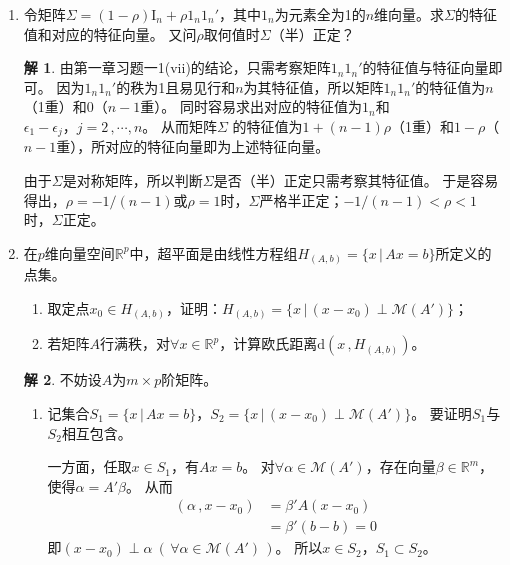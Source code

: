 \documentclass[10pt]{article}
\theoremstyle{definition}
\newtheorem*{solution}{解}
\theoremstyle{definition}
\begin{document}
\begin{enumerate}
    \item	%
        令矩阵$\Sigma =(1-\rho)\mathrm{I}_n+\rho 1_n1_n'$，其中$1_n$为元素全为1的$n$维向量。求$\Sigma$的特征值和对应的特征向量。
        又问$\rho$取何值时$\Sigma$（半）正定？

        \begin{solution}
            由第一章习题一1(vii)的结论，只需考察矩阵$1_n1_n'$的特征值与特征向量即可。
            因为$1_n1_n'$的秩为1且易见行和$n$为其特征值，所以矩阵$1_n1_n'$的特征值为$n$（1重）和0（$n-1$重）。
            同时容易求出对应的特征值为$1_n$和$\epsilon_1-\epsilon_j\text{，}j=2\, ,\cdots ,n$。
            从而矩阵$\Sigma$	的特征值为$1+(n-1)\rho$（1重）和$1-\rho$（$n-1$重），所对应的特征向量即为上述特征向量。

            由于$\Sigma$是对称矩阵，所以判断$\Sigma$是否（半）正定只需考察其特征值。
            于是容易得出，$\rho=-1/(n-1)$或$\rho=1$时，$\Sigma$严格半正定；$-1/(n-1) < \rho <1$时，$\Sigma$正定。
        \end{solution}

    \item	%
        在$p$维向量空间$\mathbb{R}^p$中，超平面是由线性方程组$H_{(A,b)}=\{x\, |\, Ax=b\}$所定义的点集。
        \begin{enumerate}[label=(\roman*)]
            \item 取定点$x_0\in H_{(A,b)}$，证明：$H_{(A,b)}=\{x\, |\, (x-x_0) \perp \mathcal{M}(A')\}$；\\
            \item 若矩阵$A$行满秩，对$\forall x\in \mathbb{R}^p$，计算欧氏距离$\mathrm{d}(x\, ,H_{(A,b)})$。
        \end{enumerate}

        \begin{solution}
            不妨设$A$为$m\times p$阶矩阵。

            \begin{enumerate}[label=(\roman*)]
                \item
                    记集合$S_1=\{x\, |\, Ax=b\}$，$S_2=\{x\, |\, (x-x_0) \perp \mathcal{M}(A')\}$。
                    要证明$S_1$与$S_2$相互包含。

                    一方面，任取$x\in S_1$，有$Ax=b$。
                    对$\forall \alpha \in \mathcal{M}(A')$，存在向量$\beta \in \mathbb{R}^m$，使得$\alpha =A'\beta$。
                    从而
                    \begin{equation*}
                        \begin{aligned}
                            (\alpha \, ,x-x_0) & = \beta'A(x-x_0) \\
                                               & = \beta'(b-b) =0
                        \end{aligned}
                    \end{equation*}
                    即$(x-x_0)\perp \alpha \ (\, \forall \alpha \in \mathcal{M}(A')\, )$。
                    所以$x \in S_2$，$S_1 \subset S_2$。


\end{enumerate}
\end{solution}
\end{enumerate}
\end{document}
